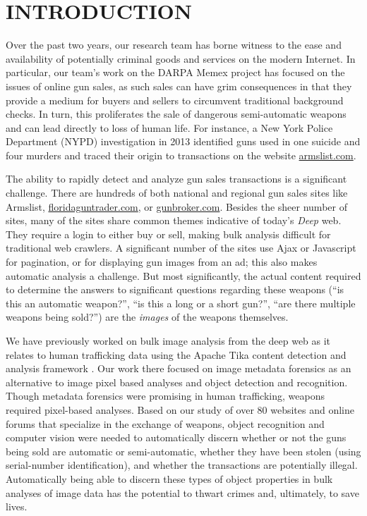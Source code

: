 \section{INTRODUCTION}
Over the past two years, our research team has borne witness to the ease and availability of potentially criminal goods and services on the modern Internet. In particular, our team's work on the DARPA Memex project has focused on the issues of online gun sales, as such sales can have grim consequences in that they provide a medium for buyers and sellers to circumvent traditional background checks. In turn, this proliferates the sale of dangerous semi-automatic weapons and can lead directly to loss of human life. For instance, a New York Police Department (NYPD) investigation in 2013 identified guns used in one suicide and four murders and traced their origin to transactions on the website \url{armslist.com}\cite{raja_2016}. 

The ability to rapidly detect and analyze gun sales transactions is a significant challenge. There are hundreds of both national and regional gun sales sites like Armslist, \url{floridaguntrader.com}, or \url{gunbroker.com}. Besides the sheer number of sites, many of the sites share common themes indicative of today's {\em Deep} web. They require a login to either buy or sell, making bulk analysis difficult for traditional web crawlers. A significant number of the sites use Ajax or Javascript for pagination, or for displaying gun images from an ad; this also makes automatic analysis a challenge. But most significantly, the actual content required to determine the answers to significant questions regarding these weapons (``is this an automatic weapon?'', ``is this a long or a short gun?'', ``are there multiple weapons being sold?'') are the {\em images} of the weapons themselves. 

We have previously worked on bulk image analysis from the deep web as it relates to human trafficking data \cite{mattmann7tg} using the Apache Tika content detection and analysis framework \cite{mattmann2011tika}. Our work there focused on image metadata forensics as an alternative to image pixel based analyses and object detection and recognition. Though metadata forensics were promising in human trafficking, weapons required pixel-based analyses. Based on our study of over 80 websites and online forums that specialize in the exchange of weapons, object recognition and computer vision were needed to automatically discern whether or not the guns being sold are automatic or semi-automatic, whether they have been stolen (using serial-number identification), and whether the transactions are potentially illegal. Automatically being able to discern these types of object properties in bulk analyses of image data has the potential to thwart crimes and, ultimately, to save lives.

